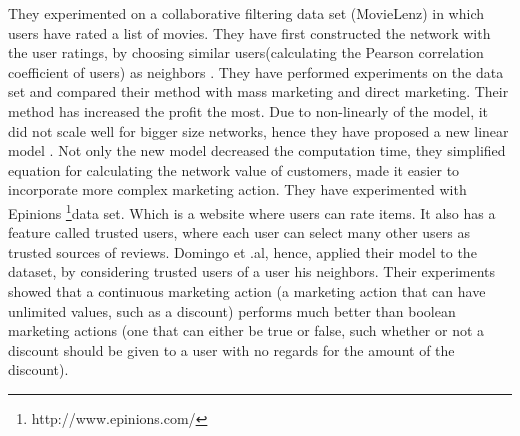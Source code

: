 \documentclass[english]{tktltiki}
\begin{document}
They experimented on a collaborative filtering data set (MovieLenz) in which users have rated a list of movies. They have first constructed the network with the user ratings, by choosing similar users(calculating the Pearson correlation coefficient of users) as neighbors . They have performed experiments on the data set and compared their method with mass marketing and direct marketing. Their method has increased the profit the most. Due to non-linearly of the model, it did not scale well for bigger size networks, hence they have proposed a new linear model \cite{domingo02}. Not only the new model decreased the computation time, they simplified equation for calculating the network value of customers, made it easier to incorporate more complex marketing action. They have experimented with Epinions \footnote{http://www.epinions.com/}data set. Which is a website where users can rate items. It also has a feature called trusted users, where each user can select many other users as trusted sources of reviews. Domingo et .al, hence, applied their model to the dataset, by considering trusted users of a user his neighbors. Their experiments showed that a continuous marketing action (a marketing action that can have unlimited values, such as a discount) performs much better than boolean marketing actions (one that can either be true or false, such whether or not a discount should be given to a user with no regards for the amount of the discount).  
\end{document}
